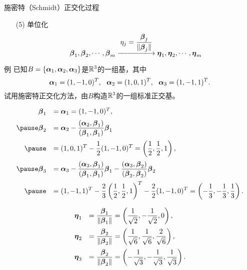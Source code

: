 \begin{frame}
  \begin{footnotesize}
    \begin{block}{施密特（Schmidt）正交化过程}
      \begin{itemize}
      \item[(5)] 单位化
        $$
        \betabd_1, \betabd_2, \cd, \betabd_m \xlongrightarrow[]{\ds \eta_j=\frac{\betabd_j}{\|\betabd_j\|}}
        \etabd_1, \etabd_2, \cd, \etabd_m
        $$
      \end{itemize}
    \end{block}
  \end{footnotesize}
\end{frame}


\begin{frame}
  \begin{footnotesize}
    \begin{exampleblock}{例}
      已知$B=\{\boldsymbol{\alpha}_1,\boldsymbol{\alpha}_2,\boldsymbol{\alpha}_3\}$是$\mathbb{R}^3$的一组基，其中
      $$
      \boldsymbol{\alpha}_1=(1,-1,0)^T,~~
      \boldsymbol{\alpha}_2=(1,0,1)^T,~~
      \boldsymbol{\alpha}_3=(1,-1,1)^T.
      $$
      试用施密特正交化方法，由$B$构造$\mathbb{R}^3$的一组标准正交基。
    \end{exampleblock}
    \pause\jiename
    $$
    \begin{array}{rl}
      \betabd_1&=\alphabd_1=(1,-1,0)^T, \\[0.2cm]\pause
      \betabd_2&\ds=\alphabd_2-\frac{(\alphabd_2,\betabd_1)}{(\betabd_1,\betabd_1)}\betabd_1\\[0.4cm]\pause
      &\ds=(1,0,1)^T-\frac12(1,-1,0)^T=\left(\frac12,\frac12,1\right),\\[0.4cm]\pause
      \betabd_3&\ds=\alphabd_3-\frac{(\alphabd_3,\betabd_1)}{(\betabd_1,\betabd_1)}\betabd_1
      -\frac{(\alphabd_3,\betabd_2)}{(\betabd_2,\betabd_2)}\betabd_2\\[0.4cm]\pause
      &\ds=(1,-1,1)^T-\frac23\left(\frac12,\frac12,1\right)^T-\frac22(1,-1,0)^T=\left(-\frac13,-\frac13,\frac13\right).
    \end{array}
    $$
  \end{footnotesize}
\end{frame}


\begin{frame}
  \begin{footnotesize}
    $$
    \begin{array}{rl}
      \boldsymbol{\eta}_1&\displaystyle =\frac{\boldsymbol{\beta}_1}{\|\boldsymbol{\beta}_1\|}=\left(\frac1{\sqrt{2}},-\frac1{\sqrt{2}},0\right),\\[0.4cm]
      \boldsymbol{\eta}_2&\displaystyle =\frac{\boldsymbol{\beta}_2}{\|\boldsymbol{\beta}_2\|}=\left(\frac1{\sqrt{6}},\frac1{\sqrt{6}},\frac2{\sqrt{6}}\right),\\[0.4cm]
      \boldsymbol{\eta}_3&\displaystyle =\frac{\boldsymbol{\beta}_2}{\|\boldsymbol{\beta}_2\|}=\left(-\frac1{\sqrt{3}},-\frac1{\sqrt{3}},\frac1{\sqrt{3}}\right).
    \end{array}
    $$
  \end{footnotesize}
\end{frame}
